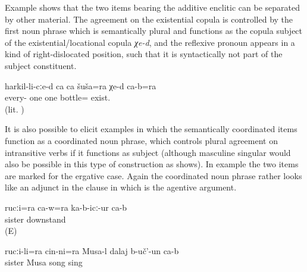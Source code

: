 Example  shows that the two items bearing the additive enclitic  can be separated by other material. The agreement on the existential copula is controlled by the first noun phrase  which is semantically plural and functions as the copula subject of the existential\slash locational copula \textit{χe-d}, and the reflexive pronoun appears in a kind of right-dislocated position, such that it is syntactically not part of the subject constituent. 
%
\begin{exe}
	\ex	\label{ex:‎Everybody is with a bottle in their hands. (lit. There is one bottle each in everybody's (hand), and they also.)}
	\gll	harkil-li-cːe-d	ca	ca	šuša=ra	χe-d	ca-b=ra\\
		every-	one	one bottle=	exist.		\\
	\glt	{} (lit. )
\end{exe}
%
It is also possible to elicit examples in which the semantically coordinated items function as a coordinated noun phrase, which controls plural agreement on intransitive verbs if it functions as subject  (although masculine singular would also be possible in this type of construction as  shows). In example  the two items are marked for the ergative case. Again the coordinated noun phrase rather looks like an adjunct in the clause in which  is the agentive argument.
%
\begin{exe}
	\ex	\label{ex:‎He and (his) sister were standing there}
	\gll	rucːi=ra	ca-w=ra	ka-b-icː-ur	ca-b\\
		sister		downstand	\\
	\glt	{} (E)

	\ex	\label{ex:Musa sang a song together with his sister}
	\gll	rucːi-li=ra	cin-ni=ra	Musa-l	dalaj	b-uč'-un	ca-b\\
		sister		Musa	song	sing	\\
	\glt	{}
\end{exe}

